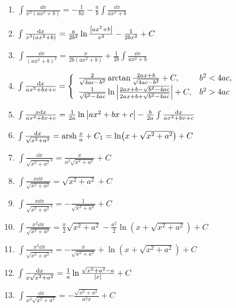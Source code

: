\begin{enumerate}
\item \(\int \frac{\dd{x}}{x^2(ax^2+b)} = -\frac{1}{bx} - \frac{a}{b} \int \frac{\dd{x}}{ax^2+b}\)

\item \(\int \frac{\dd{x}}{x^3(ax^2+b)} = \frac{a}{2b^2} \ln\frac{\abs{ax^2+b}}{x^2} - \frac{1}{2bx^2} + C\)

\item \(\int \frac{\dd{x}}{(ax^2+b)^2} = \frac{x}{2b(ax^2+b)} + \frac{1}{2b} \int \frac{\dd{x}}{ax^2+b}\)

\item \(\int \frac{\dd{x}}{ax^2+bx+c} = \left\{ \begin{array}{ll}
\frac{2}{\sqrt{4ac-b^2}} \arctan\frac{2ax+b}{\sqrt{4ac-b^2}} + C, & b^2<4ac, \\
\frac{1}{\sqrt{b^2-4ac}} \ln\abs{\frac{2ax+b-\sqrt{b^2-4ac}}{2ax+b+\sqrt{b^2-4ac}}} + C, & b^2>4ac
\end{array} \right.\)

\item \(\int \frac{x \dd{x}}{ax^2+bx+c} = \frac{1}{2a} \ln\abs{ax^2+bx+c} - \frac{b}{2a} \int \frac{\dd{x}}{ax^2+bx+c}\)

\item \(\int \frac{\dd{x}}{\sqrt{x^2+a^2}} = \operatorname{arsh}\frac{x}{a} + C_1
= \ln(x+\sqrt{x^2+a^2}) + C\)

\item \(\int \frac{\dd{x}}{\sqrt{x^2+a^2}^3} = \frac{x}{a^2 \sqrt{x^2+a^2}} + C\)

\item \(\int \frac{x \dd{x}}{\sqrt{x^2+a^2}} = \sqrt{x^2+a^2} + C\)

\item \(\int \frac{x \dd{x}}{\sqrt{x^2+a^2}^3} = -\frac{1}{\sqrt{x^2+a^2}} + C\)

\item \(\int \frac{x^2 \dd{x}}{\sqrt{x^2+a^2}} = \frac{x}{2}\sqrt{x^2+a^2} - \frac{a^2}{2} \ln(x+\sqrt{x^2+a^2}) + C\)

\item \(\int \frac{x^2 \dd{x}}{\sqrt{x^2+a^2}^3} = -\frac{x}{\sqrt{x^2+a^2}} + \ln(x+\sqrt{x^2+a^2}) + C\)

\item \(\int \frac{\dd{x}}{x\sqrt{x^2+a^2}} = \frac{1}{a} \ln\frac{\sqrt{x^2+a^2}-a}{\abs{x}} + C\)

\item \(\int \frac{\dd{x}}{x^2\sqrt{x^2+a^2}} = -\frac{\sqrt{x^2+a^2}}{a^2 x} + C\)


\end{enumerate}
